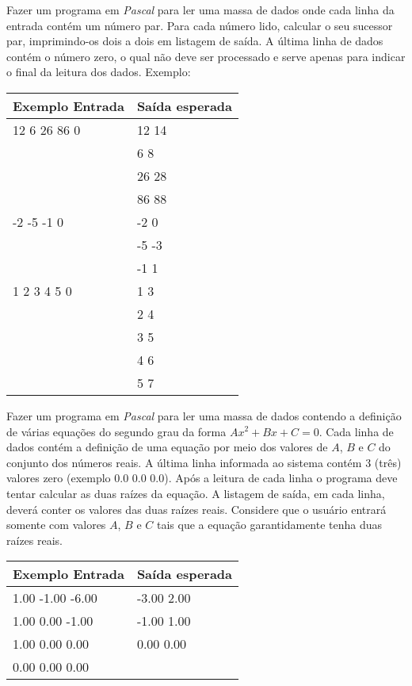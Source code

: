 
\item Fazer um programa em \emph{Pascal} para
    ler uma massa de dados onde cada  linha da entrada contém um número  par.
    Para
    cada número lido,  calcular o seu sucessor par,  imprimindo-os dois a
    dois em  listagem de saída. A  última linha de dados  contém o número
    zero, o qual não deve ser processado e serve apenas para indicar o final
    da leitura dos dados. Exemplo:

\begin{center}
\begin{tabular}{|l|l|} \hline
Exemplo Entrada & Saída esperada \\ \hline
12 6 26 86 0    & 12 14          \\ 
                & 6 8            \\ 
                & 26 28          \\ 
                & 86 88          \\ \hline
-2 -5 -1 0      & -2 0           \\
                & -5 -3          \\ 
                & -1 1           \\ \hline
1 2 3 4 5 0     & 1 3            \\
                & 2 4            \\
                & 3 5            \\
                & 4 6            \\
                & 5 7            \\ \hline
\end{tabular}
\end{center}

\item Fazer um programa em \emph{Pascal} para
    ler  uma massa de  dados contendo a  definição de várias  equações do
    segundo grau da forma $Ax^{2} + Bx + C = 0$. Cada linha de dados contém a
    definição de uma equação por meio dos valores de $A$, $B$ e $C$ do conjunto
    dos  números reais.  A última  linha  informada ao  sistema contém  3
    (três) valores  zero (exemplo  0.0 0.0 0.0).  Após a leitura  de cada
    linha o  programa deve tentar calcular  as duas raízes  da equação. A
    listagem de saída, em cada  linha, deverá conter
    os valores das duas raízes reais. Considere
    que o usuário entrará somente com valores $A$, $B$ e $C$ tais que a equação
    garantidamente tenha duas raízes reais. 

\begin{center}
\begin{tabular}{|l|l|} \hline
Exemplo Entrada & Saída esperada \\ \hline
1.00 -1.00 -6.00 & -3.00 2.00 \\
1.00 0.00 -1.00  & -1.00 1.00 \\
1.00 0.00 0.00   & 0.00 0.00  \\ 
0.00 0.00 0.00   &            \\ \hline
\end{tabular}
\end{center}

